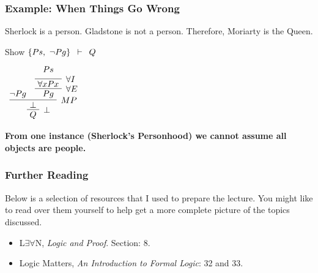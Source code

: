 \documentclass{beamer}
\theoremstyle{indentDefn} \newtheorem{defn}[]{Definition}
\begin{document}
\begin{frame}
	\frametitle{Example: When Things Go Wrong}
	
	Sherlock is a person. Gladstone is not a person. Therefore, Moriarty is the Queen.
	
	\vspace{0.5cm}
	
	Show $\{Ps, \ \lnot Pg\} \hspace{0.5em} \vdash \hspace{0.5em} Q$
	
	
	\begin{center}
		$\begin{array}{c}
			\infer[\bot]{Q}
				{\infer[MP]{ \ \bot \ }{\lnot Pg & \infer[\forall E]{ \ Pg \ }{\infer[\forall I]{ \ \forall x Px \ }{Ps\vspace{0.2cm}}}}}
		\end{array}$
	\end{center}
	
	\pause
	{\bf From one instance (Sherlock's Personhood) we cannot assume all objects are people.}
	
\end{frame}

\begin{frame}
  \frametitle{Further Reading}


Below is a selection of resources that I used to prepare the lecture. You might like to read over them yourself to help get a more complete picture of the topics discussed. 

\vspace{0.5cm}

\begin{itemize}
	\item L$\exists \forall$N, \emph{Logic and Proof}. Section: 8.  
	\item Logic Matters, \emph{An Introduction to Formal Logic}: 32 and 33.
\end{itemize}

\end{frame}
\end{document}
